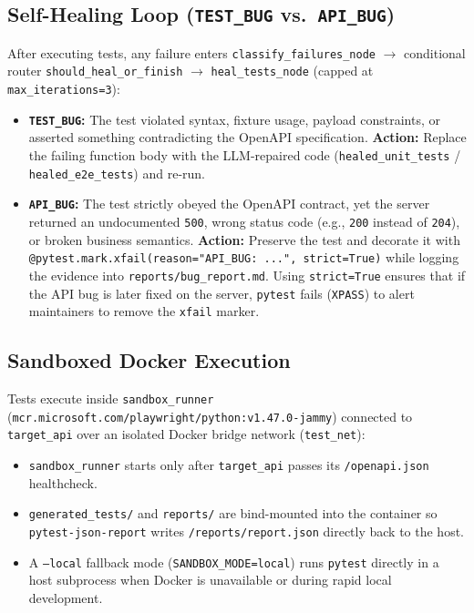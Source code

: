 \documentclass[11pt,a4paper]{article}
\begin{document}
\subsection{Self-Healing Loop (\texttt{TEST\_BUG} vs.\ \texttt{API\_BUG})}
After executing tests, any failure enters \texttt{classify\_failures\_node} $\rightarrow$ conditional router \texttt{should\_heal\_or\_finish} $\rightarrow$ \texttt{heal\_tests\_node} (capped at \texttt{max\_iterations=3}):
\begin{itemize}[leftmargin=1.5em]
    \item \textbf{\texttt{TEST\_BUG}:} The test violated syntax, fixture usage, payload constraints, or asserted something contradicting the OpenAPI specification. \textbf{Action:} Replace the failing function body with the LLM-repaired code (\texttt{healed\_unit\_tests} / \texttt{healed\_e2e\_tests}) and re-run.
    \item \textbf{\texttt{API\_BUG}:} The test strictly obeyed the OpenAPI contract, yet the server returned an undocumented \texttt{500}, wrong status code (e.g., \texttt{200} instead of \texttt{204}), or broken business semantics. \textbf{Action:} Preserve the test and decorate it with \texttt{@pytest.mark.xfail(reason="API\_BUG: ...", strict=True)} while logging the evidence into \texttt{reports/bug\_report.md}. Using \texttt{strict=True} ensures that if the API bug is later fixed on the server, \texttt{pytest} fails (\texttt{XPASS}) to alert maintainers to remove the \texttt{xfail} marker.
\end{itemize}

\subsection{Sandboxed Docker Execution}
Tests execute inside \texttt{sandbox\_runner} (\texttt{mcr.microsoft.com/playwright/python:v1.47.0-jammy}) connected to \texttt{target\_api} over an isolated Docker bridge network (\texttt{test\_net}):
\begin{itemize}[leftmargin=1.5em]
    \item \texttt{sandbox\_runner} starts only after \texttt{target\_api} passes its \texttt{/openapi.json} healthcheck.
    \item \texttt{generated\_tests/} and \texttt{reports/} are bind-mounted into the container so \texttt{pytest-json-report} writes \texttt{/reports/report.json} directly back to the host.
    \item A \texttt{--local} fallback mode (\texttt{SANDBOX\_MODE=local}) runs \texttt{pytest} directly in a host subprocess when Docker is unavailable or during rapid local development.
\end{itemize}
\end{document}
